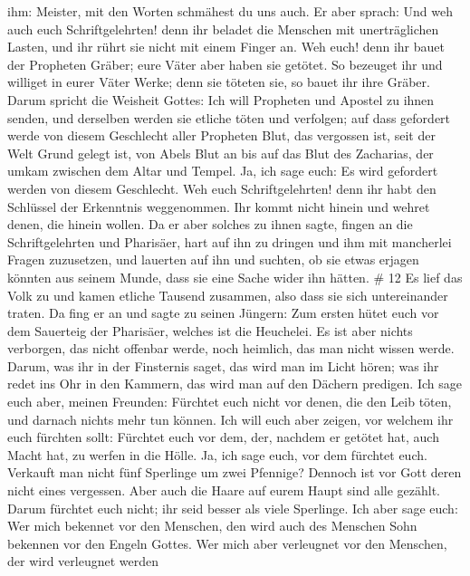ihm: Meister, mit den Worten schmähest du uns auch.  Er
aber sprach: Und weh auch euch Schriftgelehrten! denn ihr beladet die
Menschen mit unerträglichen Lasten, und ihr rührt sie nicht mit einem
Finger an.  Weh euch! denn ihr bauet der Propheten Gräber;
eure Väter aber haben sie getötet.  So bezeuget ihr und
williget in eurer Väter Werke; denn sie töteten sie, so bauet ihr ihre
Gräber.  Darum spricht die Weisheit Gottes: Ich will
Propheten und Apostel zu ihnen senden, und derselben werden sie etliche
töten und verfolgen;  auf dass gefordert werde von diesem
Geschlecht aller Propheten Blut, das vergossen ist, seit der Welt Grund
gelegt ist,  von Abels Blut an bis auf das Blut des
Zacharias, der umkam zwischen dem Altar und Tempel. Ja, ich sage euch:
Es wird gefordert werden von diesem Geschlecht.  Weh euch
Schriftgelehrten! denn ihr habt den Schlüssel der Erkenntnis
weggenommen. Ihr kommt nicht hinein und wehret denen, die hinein wollen.
 Da er aber solches zu ihnen sagte, fingen an die
Schriftgelehrten und Pharisäer, hart auf ihn zu dringen und ihm mit
mancherlei Fragen zuzusetzen,  und lauerten auf ihn und
suchten, ob sie etwas erjagen könnten aus seinem Munde, dass sie eine
Sache wider ihn hätten. \# 12  Es lief das Volk zu und kamen
etliche Tausend zusammen, also dass sie sich untereinander traten. Da
fing er an und sagte zu seinen Jüngern: Zum ersten hütet euch vor dem
Sauerteig der Pharisäer, welches ist die Heuchelei.  Es ist
aber nichts verborgen, das nicht offenbar werde, noch heimlich, das man
nicht wissen werde.  Darum, was ihr in der Finsternis saget,
das wird man im Licht hören; was ihr redet ins Ohr in den Kammern, das
wird man auf den Dächern predigen.  Ich sage euch aber,
meinen Freunden: Fürchtet euch nicht vor denen, die den Leib töten, und
darnach nichts mehr tun können.  Ich will euch aber zeigen,
vor welchem ihr euch fürchten sollt: Fürchtet euch vor dem, der, nachdem
er getötet hat, auch Macht hat, zu werfen in die Hölle. Ja, ich sage
euch, vor dem fürchtet euch.  Verkauft man nicht fünf
Sperlinge um zwei Pfennige? Dennoch ist vor Gott deren nicht eines
vergessen.  Aber auch die Haare auf eurem Haupt sind alle
gezählt. Darum fürchtet euch nicht; ihr seid besser als viele Sperlinge.
 Ich aber sage euch: Wer mich bekennet vor den Menschen, den
wird auch des Menschen Sohn bekennen vor den Engeln Gottes. 
Wer mich aber verleugnet vor den Menschen, der wird verleugnet werden
